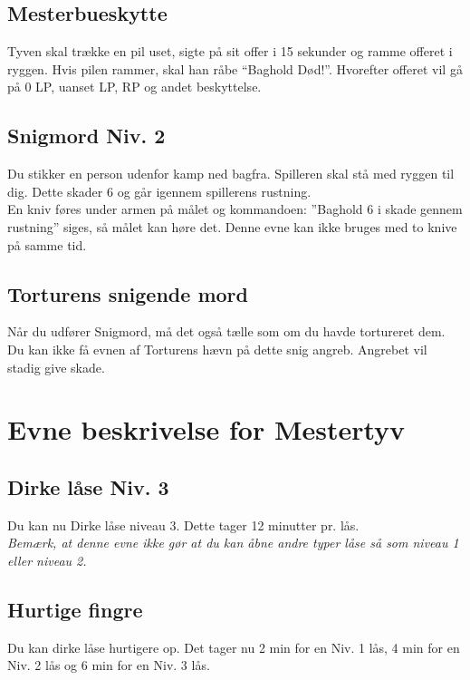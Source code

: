 \subsection{Mesterbueskytte}
Tyven skal trække en pil uset, sigte på sit offer i 15 sekunder og ramme offeret i ryggen. Hvis pilen rammer, skal han råbe “Baghold Død!”. Hvorefter offeret vil gå på 0 LP, uanset LP, RP og andet beskyttelse.\\

\subsection{Snigmord Niv. 2}
Du stikker en person udenfor kamp ned bagfra. Spilleren skal stå med ryggen til dig. Dette skader 6 og går igennem spillerens rustning.\\ 
En kniv føres under armen på målet og kommandoen: ”Baghold 6 i skade gennem rustning” siges, så målet kan høre det. Denne evne kan ikke bruges med to knive på samme tid.\\

\subsection{Torturens snigende mord}
Når du udfører Snigmord, må det også tælle som om du havde tortureret dem. Du kan ikke få evnen af Torturens hævn på dette snig angreb. Angrebet vil stadig give skade.


\section{Evne beskrivelse for Mestertyv}

\subsection{Dirke låse Niv. 3}
Du kan nu Dirke låse niveau 3. Dette tager 12 minutter pr. lås.\\
\emph{Bemærk, at denne evne ikke gør at du kan åbne andre typer låse så som niveau 1 eller niveau 2.}\\

\subsection{Hurtige fingre}
Du kan dirke låse hurtigere op. Det tager nu 2 min for en Niv. 1 lås, 4 min for en Niv. 2 lås og 6 min for en Niv. 3 lås.\\

